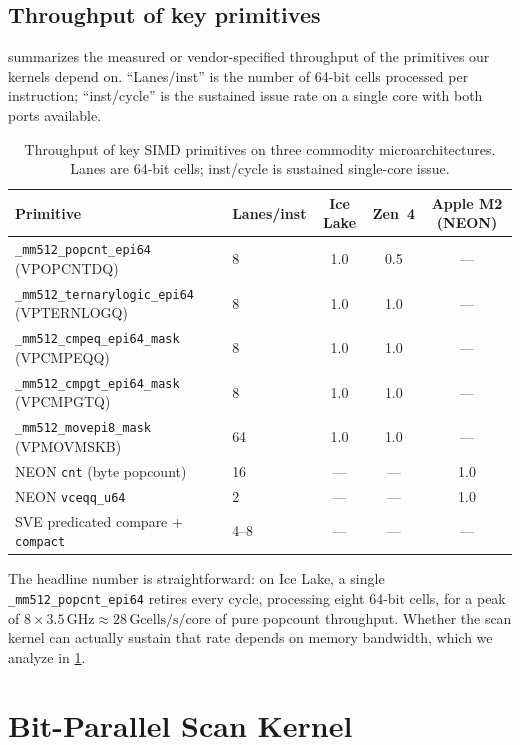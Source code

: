 \documentclass[10pt]{article}
\theoremstyle{definition}
\begin{document}
\subsection{Throughput of key primitives}

 summarizes the measured or vendor-specified throughput of the primitives our kernels depend on. ``Lanes/inst'' is the number of 64-bit cells processed per instruction; ``inst/cycle'' is the sustained issue rate on a single core with both ports available.

\begin{table}[t]
\centering
\caption{Throughput of key SIMD primitives on three commodity microarchitectures. Lanes are 64-bit cells; inst/cycle is sustained single-core issue.}
\label{tab:simd}
\small
\begin{tabular}{llccc}
\toprule
Primitive & Lanes/inst & Ice Lake & Zen~4 & Apple M2 (NEON) \\
\midrule
\texttt{\_mm512\_popcnt\_epi64} (VPOPCNTDQ) & 8 & 1.0 & 0.5 & --- \\
\texttt{\_mm512\_ternarylogic\_epi64} (VPTERNLOGQ) & 8 & 1.0 & 1.0 & --- \\
\texttt{\_mm512\_cmpeq\_epi64\_mask} (VPCMPEQQ) & 8 & 1.0 & 1.0 & --- \\
\texttt{\_mm512\_cmpgt\_epi64\_mask} (VPCMPGTQ) & 8 & 1.0 & 1.0 & --- \\
\texttt{\_mm512\_movepi8\_mask} (VPMOVMSKB) & 64 & 1.0 & 1.0 & --- \\
NEON \texttt{cnt} (byte popcount)            & 16 & --- & --- & 1.0 \\
NEON \texttt{vceqq\_u64}                     & 2  & --- & --- & 1.0 \\
SVE predicated compare + \texttt{compact}    & 4--8 & --- & --- & --- \\
\bottomrule
\end{tabular}
\end{table}

The headline number is straightforward: on Ice Lake, a single \texttt{\_mm512\_popcnt\_epi64} retires every cycle, processing eight 64-bit cells, for a peak of $8 \times 3.5\,\text{GHz} \approx 28\,\text{Gcells/s/core}$ of pure popcount throughput. Whether the scan kernel can actually sustain that rate depends on memory bandwidth, which we analyze in \cref{sec:scan}.

\section{Bit-Parallel Scan Kernel}
\label{sec:scan}
\end{document}
